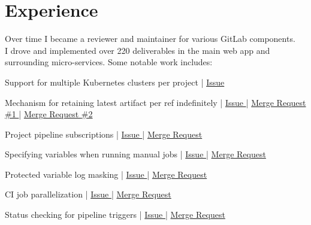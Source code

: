 \documentclass[]{matija-resume}
\begin{document}
\begin{minipage}[t]{1.0\textwidth}


\section{Experience}
\vspace{\topsep}
Over time I became a reviewer and maintainer for various GitLab components.\\
\vspace{\topsep}
I drove and implemented over 220 deliverables in the main web app and surrounding micro-services. Some notable work includes:
\vspace{\topsep}
\begin{tightemize}
\item Support for multiple Kubernetes clusters per project | \href{https://gitlab.com/gitlab-org/gitlab/-/issues/3734}{Issue }
\item Mechanism for retaining latest artifact per ref indefinitely | \href{https://gitlab.com/gitlab-org/gitlab/-/issues/16267}{Issue } | \href{https://gitlab.com/gitlab-org/gitlab/-/merge_requests/29802}{Merge Request \#1 } | \href{https://gitlab.com/gitlab-org/gitlab/-/merge_requests/30741}{Merge Request \#2 }
\item Project pipeline subscriptions | \href{https://gitlab.com/gitlab-org/gitlab/-/issues/9045}{Issue } | \href{https://gitlab.com/gitlab-org/gitlab/-/merge_requests/20063}{Merge Request }
\item Specifying variables when running manual jobs | \href{https://gitlab.com/gitlab-org/gitlab-foss/-/issues/24935}{Issue } | \href{https://gitlab.com/gitlab-org/gitlab-foss/-/merge_requests/30485}{Merge Request }
\item Protected variable log masking | \href{https://gitlab.com/gitlab-org/gitlab-foss/-/issues/13784}{Issue } | \href{hhttps://gitlab.com/gitlab-org/gitlab-foss/-/merge_requests/25293}{Merge Request }
\item CI job parallelization | \href{https://gitlab.com/gitlab-org/gitlab-foss/-/issues/21480}{Issue } | \href{https://gitlab.com/gitlab-org/gitlab-foss/-/merge_requests/22631}{Merge Request }
\item Status checking for pipeline triggers | \href{https://gitlab.com/gitlab-org/gitlab/-/issues/11238}{Issue } | \href{https://gitlab.com/gitlab-org/gitlab/-/merge_requests/15580}{Merge Request }
\end{tightemize}
\sectionsep


\end{minipage}
\end{document}
